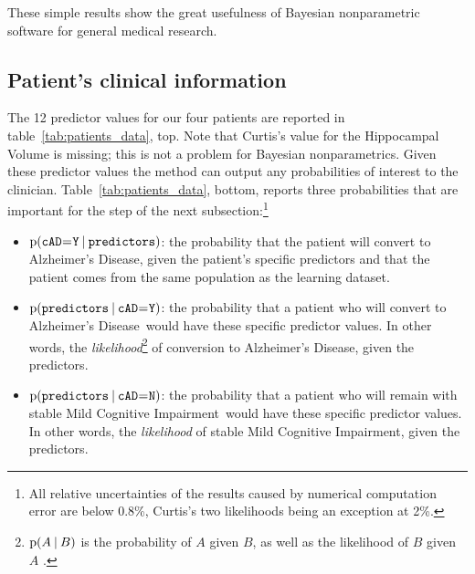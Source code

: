 \documentclass[a4paper,12pt,%
onecolumn,oneside,article,%
british%
]{memoir}
\theoremstyle{remark}
\theoremstyle{innote}
\newcommand*{\p}{\mathrm{p}}%
\renewcommand*{\|}[1][]{\nonscript\:#1\vert\nonscript\:\mathopen{}}
\newcommand*{\mo}[1][=]{\mathclose{}\mathord{\nonscript\mkern0.5mu#1\nonscript\mkern0.5mu}\mathopen{}}
\newcommand*{\sect}{\S}%
\newcommand*{\cad}{\texttt{cAD}}
\newcommand*{\yes}{\texttt{Y}}
\newcommand*{\no}{\texttt{N}}
\newcommand*{\predictors}{\texttt{predictors}}
\newcommand*{\ad}{Alzheimer's Disease}
\newcommand*{\mci}{Mild Cognitive Impairment}
\begin{document}
These simple results show the great usefulness of Bayesian nonparametric software for general medical research.


\subsection{Patient's clinical information}
\label{sec:predictor_step}

The 12 predictor values for our four patients are reported in table~\ref{tab:patients_data}, top. Note that Curtis's value for the Hippocampal Volume is missing; this is not a problem for Bayesian nonparametrics. Given these predictor values the method can output any probabilities of interest to the clinician. Table~\ref{tab:patients_data}, bottom, reports three probabilities that are important for the step of the next subsection:\footnote{All relative uncertainties of the results caused by numerical computation error are below 0.8\%, Curtis's two likelihoods being an exception at 2\%.}
\begin{itemize}
\item $\p(\cad\mo\yes \| \predictors)$: the probability that the patient will convert to \ad, given the patient's specific predictors and that the patient comes from the same population as the learning dataset.
\item $\p(\predictors \| \cad\mo\yes)$: the probability that a patient who will convert to \ad\ would have these specific predictor values. In other words, the \emph{likelihood}\footnote{$\p(A\|B)$ is the probability of $A$ given $B$, as well as the likelihood of $B$ given $A$ \autocites[\sect\,6.1]{good1950}.} of conversion to \ad, given the predictors.
\item $\p(\predictors \| \cad\mo\no)$: the probability that a patient who will remain with stable \mci\ would have these specific predictor values. In other words, the \emph{likelihood} of stable \mci, given the predictors.
\end{itemize}
\end{document}
